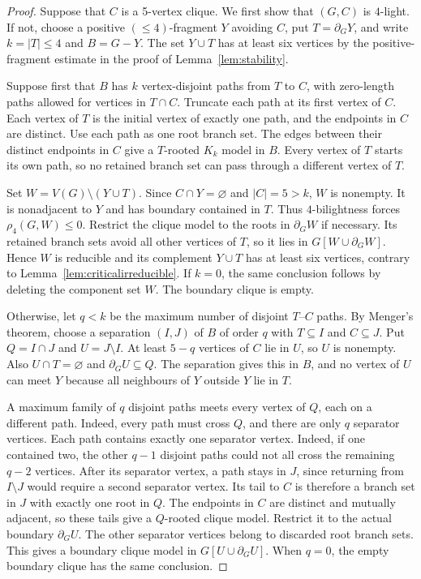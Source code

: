 \documentclass[11pt]{article}
\theoremstyle{remark}
\numberwithin{equation}{section}
\newcommand{\dd}{\partial}
\begin{document}
\begin{proof}
Suppose that $C$ is a 5-vertex clique. We first show that $(G,C)$ is $4$-light. If not, choose a positive $(\le4)$-fragment $Y$ avoiding $C$, put $T=\dd_GY$, and write $k=|T|\le4$ and $B=G-Y$. The set $Y\cup T$ has at least six vertices by the positive-fragment estimate in the proof of Lemma~\ref{lem:stability}.

Suppose first that $B$ has $k$ vertex-disjoint paths from $T$ to $C$, with zero-length paths allowed for vertices in $T\cap C$. Truncate each path at its first vertex of $C$. Each vertex of $T$ is the initial vertex of exactly one path, and the endpoints in $C$ are distinct. Use each path as one root branch set. The edges between their distinct endpoints in $C$ give a $T$-rooted $K_k$ model in $B$. Every vertex of $T$ starts its own path, so no retained branch set can pass through a different vertex of $T$.

Set $W=V(G)\setminus(Y\cup T)$. Since $C\cap Y=\varnothing$ and $|C|=5>k$, $W$ is nonempty. It is nonadjacent to $Y$ and has boundary contained in $T$. Thus $4$-bilightness forces $\rho_4(G,W)\le0$. Restrict the clique model to the roots in $\dd_GW$ if necessary. Its retained branch sets avoid all other vertices of $T$, so it lies in $G[W\cup\dd_GW]$. Hence $W$ is reducible and its complement $Y\cup T$ has at least six vertices, contrary to Lemma~\ref{lem:criticalirreducible}. If $k=0$, the same conclusion follows by deleting the component set $W$. The boundary clique is empty.

Otherwise, let $q<k$ be the maximum number of disjoint $T$--$C$ paths. By Menger's theorem, choose a separation $(I,J)$ of $B$ of order $q$ with $T\subseteq I$ and $C\subseteq J$. Put $Q=I\cap J$ and $U=J\setminus I$. At least $5-q$ vertices of $C$ lie in $U$, so $U$ is nonempty. Also $U\cap T=\varnothing$ and $\dd_GU\subseteq Q$. The separation gives this in $B$, and no vertex of $U$ can meet $Y$ because all neighbours of $Y$ outside $Y$ lie in $T$.

A maximum family of $q$ disjoint paths meets every vertex of $Q$, each on a different path. Indeed, every path must cross $Q$, and there are only $q$ separator vertices. Each path contains exactly one separator vertex. Indeed, if one contained two, the other $q-1$ disjoint paths could not all cross the remaining $q-2$ vertices. After its separator vertex, a path stays in $J$, since returning from $I\setminus J$ would require a second separator vertex. Its tail to $C$ is therefore a branch set in $J$ with exactly one root in $Q$. The endpoints in $C$ are distinct and mutually adjacent, so these tails give a $Q$-rooted clique model. Restrict it to the actual boundary $\dd_GU$. The other separator vertices belong to discarded root branch sets. This gives a boundary clique model in $G[U\cup\dd_GU]$. When $q=0$, the empty boundary clique has the same conclusion.


\end{proof}
\end{document}
